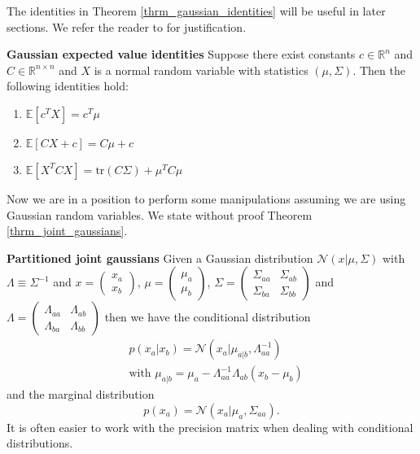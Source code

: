 The identities in Theorem \ref{thrm_gaussian_identities} will be useful in later sections. We refer the reader to \cite{davidian} for justification.
\begin{thrm}
\textbf{Gaussian expected value identities}
Suppose there exist constants $c \in \mathbb{R}^n$ and $C \in \mathbb{R}^{n \times n}$ and $X$ is a normal random variable with statistics $(\mu, \Sigma)$. Then the following identities hold:
\begin{enumerate}
\item
$\mathbb{E}[c^TX] = c^T\mu$
\item
$\mathbb{E}[CX+c] = C\mu + c$
\item
$\mathbb{E}[X^TCX] = \text{tr}(C\Sigma) + \mu^TC\mu$
\end{enumerate}
\label{thrm_gaussian_identities}
\end{thrm}  
Now we are in a position to perform some manipulations assuming we are using Gaussian random variables. We state without proof Theorem \ref{thrm_joint_gaussians}.
\begin{thrm}
\textbf{Partitioned joint gaussians}
Given a Gaussian distribution $\mathcal{N}(x|\mu,\Sigma)$ with $\Lambda \equiv \Sigma^{-1}$ and $x=\begin{pmatrix}
x_a \\ x_b
\end{pmatrix}$, $\mu=\begin{pmatrix}
\mu_a \\ \mu_b
\end{pmatrix}$, $\Sigma=\begin{pmatrix}
\Sigma_{aa} & \Sigma_{ab} \\ \Sigma_{ba} & \Sigma_{bb}
\end{pmatrix}$ and $\Lambda = \begin{pmatrix}
\Lambda_{aa} & \Lambda_{ab} \\ \Lambda_{ba} & \Lambda_{bb}
\end{pmatrix}$ then we have the conditional distribution 
\begin{equation}
\begin{aligned}
&p(x_a|x_b) = \mathcal{N}(x_a|\mu_{a|b}, \Lambda_{aa}^{-1}) \\
&\text{with } \mu_{a|b} = \mu_a - \Lambda_{aa}^{-1}\Lambda_{ab}(x_b-\mu_b)
\end{aligned}
\label{eq_part_joint_gauss1}
\end{equation}
and the marginal distribution
\begin{equation}
p(x_a) = \mathcal{N}(x_a|\mu_a,\Sigma_{aa}).
\label{eq_part_joint_gauss2}
\end{equation}
\label{thrm_joint_gaussians}
It is often easier to work with the precision matrix when dealing with conditional distributions. 
\end{thrm}

